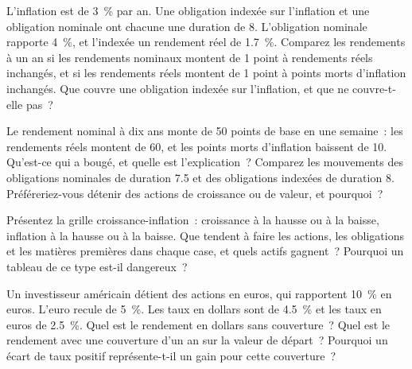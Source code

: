 \begin{question}\label{iq:iv2:macro-market-knowledge-and-pitches:20}
L'inflation est de 3~\% par an. Une obligation indexée sur l'inflation et une obligation nominale ont chacune une duration de 8. L'obligation nominale rapporte 4~\%, et l'indexée un rendement réel de 1.7~\%. Comparez les rendements à un an si les rendements nominaux montent de 1 point à rendements réels inchangés, et si les rendements réels montent de 1 point à points morts d'inflation inchangés. Que couvre une obligation indexée sur l'inflation, et que ne couvre-t-elle pas~?
\end{question}

\begin{question}\label{iq:iv2:macro-market-knowledge-and-pitches:21}
Le rendement nominal à dix ans monte de 50 points de base en une semaine~: les rendements réels montent de 60, et les points morts d'inflation baissent de 10. Qu'est-ce qui a bougé, et quelle est l'explication~? Comparez les mouvements des obligations nominales de duration 7.5 et des obligations indexées de duration 8. Préféreriez-vous détenir des actions de croissance ou de valeur, et pourquoi~?
\end{question}

\begin{question}\label{iq:iv2:macro-market-knowledge-and-pitches:22}
Présentez la grille croissance-inflation~: croissance à la hausse ou à la baisse, inflation à la hausse ou à la baisse. Que tendent à faire les actions, les obligations et les matières premières dans chaque case, et quels actifs gagnent~? Pourquoi un tableau de ce type est-il dangereux~?
\end{question}

\begin{question}\label{iq:iv2:macro-market-knowledge-and-pitches:23}
Un investisseur américain détient des actions en euros, qui rapportent 10~\% en euros. L'euro recule de 5~\%. Les taux en dollars sont de 4.5~\% et les taux en euros de 2.5~\%. Quel est le rendement en dollars sans couverture~? Quel est le rendement avec une couverture d'un an sur la valeur de départ~? Pourquoi un écart de taux positif représente-t-il un gain pour cette couverture~?
\end{question}

